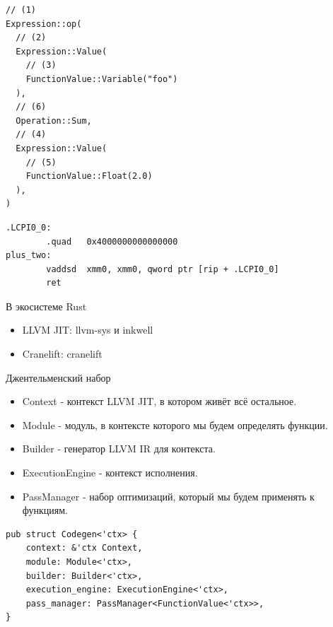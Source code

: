 \begin{frame}[fragile]
    \begin{verbatim}
// (1)
Expression::op(
  // (2)
  Expression::Value(
    // (3)
    FunctionValue::Variable("foo")
  ),
  // (6)
  Operation::Sum,
  // (4)
  Expression::Value(
    // (5)
    FunctionValue::Float(2.0)
  ),
)
    \end{verbatim}
\end{frame}

\begin{frame}[fragile]
    \begin{verbatim}
.LCPI0_0:
        .quad   0x4000000000000000
plus_two:
        vaddsd  xmm0, xmm0, qword ptr [rip + .LCPI0_0]
        ret
    \end{verbatim}
\end{frame}

\begin{frame}{В экосистеме Rust}
  \begin{itemize}
    \item LLVM JIT: llvm-sys и inkwell
    \item Cranelift: cranelift
  \end{itemize}
\end{frame}

\begin{frame}{Джентельменский набор}
  \begin{itemize}
    \item Context - контекст LLVM JIT, в котором живёт всё остальное.
    \item Module  - модуль, в контексте которого мы будем определять функции.
    \item Builder - генератор LLVM IR для контекста.
    \item ExecutionEngine - контекст исполнения.
    \item PassManager - набор оптимизаций, который мы будем применять к функциям.
  \end{itemize}
\end{frame}

\begin{frame}[fragile]
    \begin{verbatim}
pub struct Codegen<'ctx> {
    context: &'ctx Context,
    module: Module<'ctx>,
    builder: Builder<'ctx>,
    execution_engine: ExecutionEngine<'ctx>,
    pass_manager: PassManager<FunctionValue<'ctx>>,
}
    \end{verbatim}
\end{frame}


